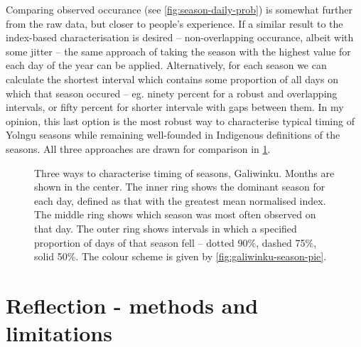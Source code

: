 Comparing observed occurance (see \cref{fig:season-daily-prob}) is somewhat
further from the raw data, but closer to people's experience.  If a similar
result to the index-based characterisation is desired -- non-overlapping
occurance, albeit with some jitter -- the same approach of taking the season
with the highest value for each day of the year can be applied.
%
Alternatively, for each season we can calculate the shortest interval which
contains some proportion of all days on which that season occured -- eg.
ninety percent for a robust and overlapping intervals, or fifty percent for
shorter intervale with gaps between them.  In my opinion, this last option
is the most robust way to characterise typical timing of Yolngu seasons while
remaining well-founded in Indigenous definitions of the seasons.
%
All three approaches are drawn for comparison in \cref{fig:galiwinku-seasons}.


\begin{figure}[h]
    \centering
    \vspace{1.5in} \vspace{1.5in}
    \caption[Three ways to characterise timing of seasons, Galiwinku]{
        Three ways to characterise timing of seasons, Galiwinku.
        Months are shown in the center.  The inner ring shows the dominant season
        for each day, defined as that with the greatest mean normalised index.
        The middle ring shows which season was most often observed on that day.
        The outer ring shows intervals in which a specified proportion of days
        of that season fell -- dotted 90\%, dashed 75\%, solid 50\%.
        The colour scheme is given by \cref{fig:galiwinku-season-pie}.
        }
    \label{fig:galiwinku-seasons}
\end{figure}



\section{Reflection - methods and limitations}
\label{sec:disc-reflection}









